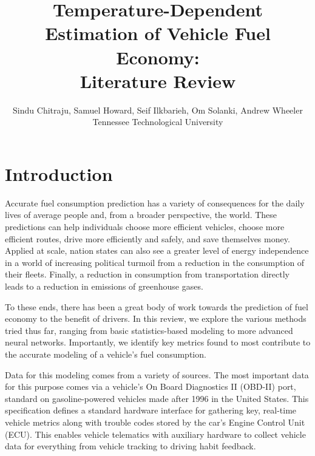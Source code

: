 \documentclass[letterpaper]{article}
\begin{document}

\nocopyright

\title{Temperature-Dependent Estimation of Vehicle Fuel Economy:\\Literature Review}
\author{Sindu Chitraju, Samuel Howard, Seif Ilkbarieh, Om Solanki, Andrew Wheeler\\
Tennessee Technological University
}

\maketitle

\section*{Introduction}

Accurate fuel consumption prediction has a variety of consequences for the daily
lives of average people and, from a broader perspective, the world. These
predictions can help individuals choose more efficient vehicles, choose more
efficient routes, drive more efficiently and safely, and save themselves money.
Applied at scale, nation states can also see a greater level of energy
independence in a world of increasing political turmoil from a reduction in the
consumption of their fleets. Finally, a reduction in consumption from
transportation directly leads to a reduction in emissions of greenhouse gases.

To these ends, there has been a great body of work towards the prediction of
fuel economy to the benefit of drivers. In this review, we explore the various
methods tried thus far, ranging from basic statistics-based modeling to more
advanced neural networks. Importantly, we identify key metrics found to most
contribute to the accurate modeling of a vehicle's fuel consumption. 

Data for this modeling comes from a variety of sources. The most important data for this
purpose comes via a vehicle's On Board Diagnostics II (OBD-II) port, standard on
gasoline-powered vehicles made after 1996 in the United States. This
specification defines a standard hardware interface for gathering key, real-time
vehicle metrics along with trouble codes stored by the car's Engine Control Unit
(ECU). This enables vehicle telematics with auxiliary hardware to collect
vehicle data for everything from vehicle tracking to driving habit feedback. 
\end{document}
